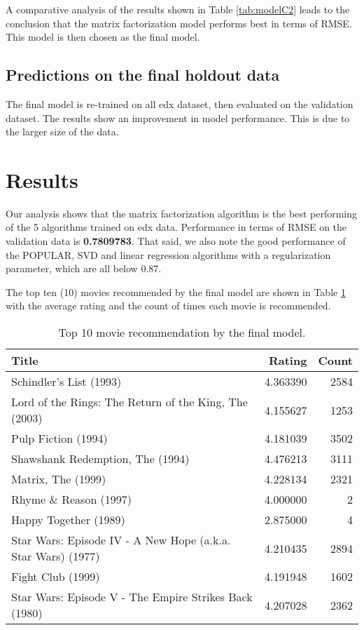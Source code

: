 \documentclass[
]{article}
\begin{document}
A comparative analysis of the results shown in Table \ref{tab:modelC2} leads to the conclusion that the matrix factorization model performs best in terms of RMSE. This model is then chosen as the final model.

\subsection{Predictions on the final holdout data}\label{predictions-on-the-final-holdout-data}

The final model is re-trained on all edx dataset, then evaluated on the validation dataset. The results show an improvement in model performance. This is due to the larger size of the data.

\section{Results}\label{results}

Our analysis shows that the matrix factorization algorithm is the best performing of the 5 algorithms trained on edx data. Performance in terms of RMSE on the validation data is \textbf{0.7809783}. That said, we also note the good performance of the POPULAR, SVD and linear regression algorithms with a regularization parameter, which are all below 0.87.

The top ten (10) movies recommended by the final model are shown in Table \ref{tab:fmodpred} with the average rating and the count of times each movie is recommended.

\begin{table}[H]
\centering
\caption{\label{tab:fmodpred}Top 10 movie recommendation by the final model.}
\centering
\begin{tabular}[t]{lrr}
\toprule
Title & Rating & Count\\
\midrule
Schindler's List (1993) & 4.363390 & 2584\\
Lord of the Rings: The Return of the King, The (2003) & 4.155627 & 1253\\
Pulp Fiction (1994) & 4.181039 & 3502\\
Shawshank Redemption, The (1994) & 4.476213 & 3111\\
Matrix, The (1999) & 4.228134 & 2321\\
\addlinespace
Rhyme \& Reason (1997) & 4.000000 & 2\\
Happy Together (1989) & 2.875000 & 4\\
Star Wars: Episode IV - A New Hope (a.k.a. Star Wars) (1977) & 4.210435 & 2894\\
Fight Club (1999) & 4.191948 & 1602\\
Star Wars: Episode V - The Empire Strikes Back (1980) & 4.207028 & 2362\\
\bottomrule
\end{tabular}
\end{table}
\end{document}
